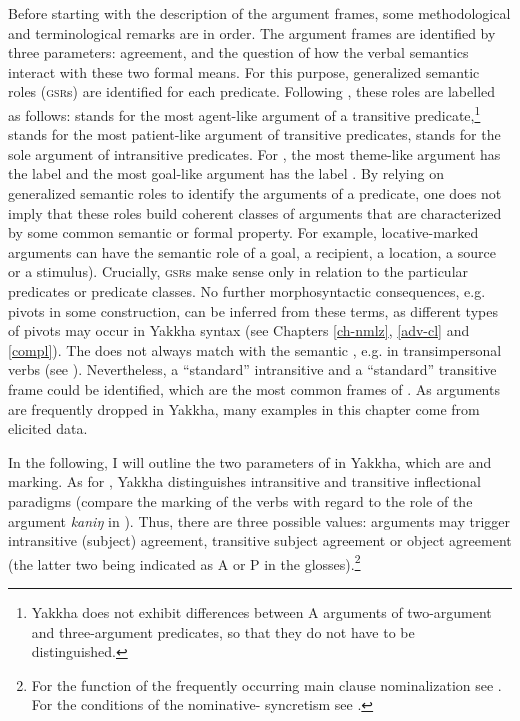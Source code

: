 Before starting with the description of the argument frames, some methodological and terminological remarks are in order. The argument frames are identified by three parameters:  agreement,   and the question of how the verbal semantics interact with these two formal means. For this purpose, generalized semantic roles (\textsc{gsr}s) are identified for each predicate. Following \citet{Bickel2010_Grammatical}, these roles are labelled as follows:  stands for the most agent-like argument of a transitive predicate,\footnote{Yakkha does not exhibit differences between A arguments of two-argument and three-argument predicates, so that they do not have to be distinguished.}  stands for the most patient-like argument of transitive predicates,  stands for the sole argument of intransitive predicates. For , the most theme-like argument has the label  and the most goal-like argument has the label .  By relying on generalized semantic roles to identify the arguments of a predicate, one does not imply that these roles build coherent  classes of arguments that are characterized by some common semantic or formal property. For example, locative-marked arguments can have the semantic role of a goal, a recipient, a location, a source or a stimulus). Crucially, \textsc{gsr}s make sense only in relation to the particular predicates or predicate classes. No further morphosyntactic consequences, e.g. pivots in some construction, can be inferred from these terms, as different types of pivots may occur in Yakkha syntax (see Chapters \ref{ch-nmlz}, \ref{adv-cl} and \ref{compl}). The  does not always match with the semantic , e.g. in transimpersonal verbs (see ). Nevertheless, a “standard” intransitive and a “standard” transitive frame could be identified, which are the most common frames of . As arguments are frequently dropped in Yakkha, many examples in this chapter come from elicited data.

In the following, I will outline the two parameters of  in Yakkha, which are  and  marking. 
As for , Yakkha distinguishes intransitive and transitive inflectional paradigms (compare the marking of the verbs with regard to the role of the  argument \emph{kaniŋ} in \Next). Thus, there are three possible values: arguments may trigger intransitive (subject) agreement, transitive subject agreement or object agreement (the latter two being indicated as A or P in the glosses).\footnote{For the function of the frequently occurring main clause nominalization see . For the conditions of the nominative- syncretism see .} 

